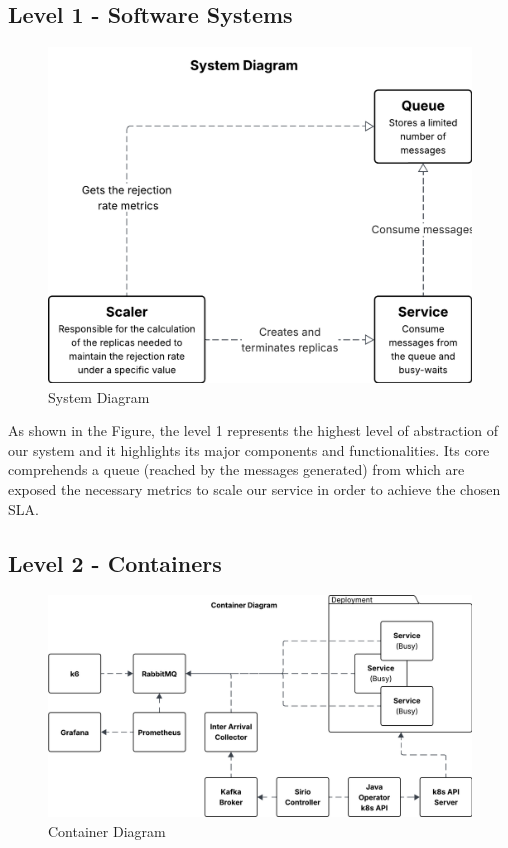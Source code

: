 \subsection{Level 1 - Software Systems}
\begin{figure}[H]
    \centering
    \includegraphics[width=0.75\linewidth]{images/C4 model/SystemDiagram.png}
    \caption{System Diagram}
    \label{fig:system_diagram}
\end{figure}

As shown in the Figure, the level 1 represents the highest level of abstraction of our system and it highlights its major components and functionalities. Its core comprehends a queue (reached by the messages generated) from which are exposed the necessary metrics to scale our service in order to achieve the chosen SLA. 

\subsection{Level 2 - Containers}

\begin{figure}[H]
    \centering
    \includegraphics[width=0.75\linewidth]{images/C4 model/ContainerDiagram.png}
    \caption{Container Diagram}
    \label{fig:container_diagram}
\end{figure}


